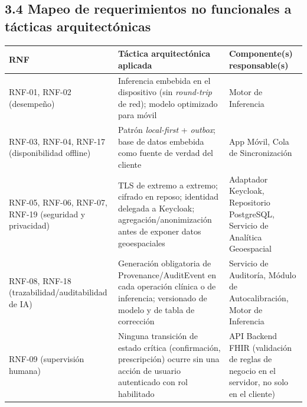 \documentclass[11pt,a4paper]{article}
\begin{document}
\subsection{3.4 Mapeo de requerimientos no funcionales a tácticas arquitectónicas}\label{mapeo-de-requerimientos-no-funcionales-a-tuxe1cticas-arquitectuxf3nicas}

{\small
\begin{longtable}[]{@{}
  >{\raggedright\arraybackslash}p{}
  >{\raggedright\arraybackslash}p{}
  >{\raggedright\arraybackslash}p{}@{}}
\toprule\noalign{}
\begin{minipage}[b]{\linewidth}\raggedright
RNF
\end{minipage} & \begin{minipage}[b]{\linewidth}\raggedright
Táctica arquitectónica aplicada
\end{minipage} & \begin{minipage}[b]{\linewidth}\raggedright
Componente(s) responsable(s)
\end{minipage} \\
\midrule\noalign{}
\endhead
\bottomrule\noalign{}
\endlastfoot
RNF-01, RNF-02 (desempeño) & Inferencia embebida en el dispositivo (sin \emph{round-trip} de red); modelo optimizado para móvil & Motor de Inferencia \\
RNF-03, RNF-04, RNF-17 (disponibilidad offline) & Patrón \emph{local-first} + \emph{outbox}; base de datos embebida como fuente de verdad del cliente & App Móvil, Cola de Sincronización \\
RNF-05, RNF-06, RNF-07, RNF-19 (seguridad y privacidad) & TLS de extremo a extremo; cifrado en reposo; identidad delegada a Keycloak; agregación/anonimización antes de exponer datos geoespaciales & Adaptador Keycloak, Repositorio PostgreSQL, Servicio de Analítica Geoespacial \\
RNF-08, RNF-18 (trazabilidad/auditabilidad de IA) & Generación obligatoria de Provenance/AuditEvent en cada operación clínica o de inferencia; versionado de modelo y de tabla de corrección & Servicio de Auditoría, Módulo de Autocalibración, Motor de Inferencia \\
RNF-09 (supervisión humana) & Ninguna transición de estado crítica (confirmación, prescripción) ocurre sin una acción de usuario autenticado con rol habilitado & API Backend FHIR (validación de reglas de negocio en el servidor, no solo en el cliente) \\

\end{longtable}}
\end{document}
